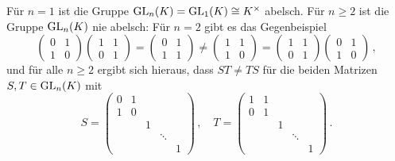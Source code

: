 \begin{solution}
  Für $n = 1$ ist die Gruppe $\operatorname{GL}_n(K) = \operatorname{GL}_1(K) \cong K^\times$ abelsch.
  Für $n \geq 2$ ist die Gruppe $\operatorname{GL}_n(K)$ nie abelsch:
  Für $n = 2$ gibt es das Gegenbeispiel
  \[
          \begin{pmatrix}
            0 & 1 \\
            1 & 0
          \end{pmatrix}
          \begin{pmatrix}
            1 & 1 \\
            0 & 1
          \end{pmatrix}
    =     \begin{pmatrix}
            0 & 1 \\
            1 & 1
          \end{pmatrix}
    \neq  \begin{pmatrix}
            1 & 1 \\
            1 & 0
          \end{pmatrix}
    =     \begin{pmatrix}
            1 & 1 \\
            0 & 1
          \end{pmatrix}
          \begin{pmatrix}
            0 & 1 \\
            1 & 0
          \end{pmatrix} \,,
  \]
  und für alle $n \geq 2$ ergibt sich hieraus, dass $ST \neq TS$ für die beiden Matrizen $S, T \in \operatorname{GL}_n(K)$ mit
  \[
      S
    = \begin{pmatrix}
        0 & 1 &   &         &   \\
        1 & 0 &   &         &   \\
          &   & 1 &         &   \\
          &   &   & \ddots  &   \\
          &   &   &         & 1
      \end{pmatrix} \,,
      \quad
      T
    = \begin{pmatrix}
        1 & 1 &   &         &   \\
        0 & 1 &   &         &   \\
          &   & 1 &         &   \\
          &   &   & \ddots  &   \\
          &   &   &         & 1
      \end{pmatrix} \,.
  \]
\end{solution}


